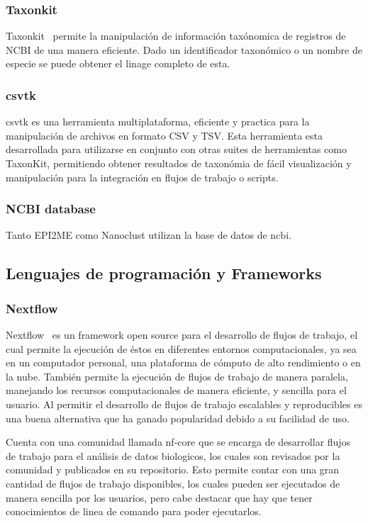 

\subsubsection{Taxonkit}
Taxonkit~\cite{SHEN2021844} permite la manipulación de información taxónomica de registros de NCBI de una manera eficiente. Dado un identificador taxonómico o un nombre de especie se puede obtener el linage completo de esta.

\subsubsection{csvtk}
csvtk es una herramienta multiplataforma, eficiente y practica para la manipulación de archivos en formato CSV y TSV. Esta herramienta esta desarrollada para utilizarse en conjunto con otras suites de herramientas como TaxonKit, permitiendo obtener resultados de taxonómia de fácil visualización y manipulación para la integración en flujos de trabajo o scripts.
\subsubsection{NCBI database}
Tanto EPI2ME como Nanoclust utilizan la base de datos de ncbi.
\subsection{Lenguajes de programación y Frameworks}
\subsubsection{Nextflow}
Nextflow~\cite{di2017nextflow} es un framework open source para el desarrollo de flujos de trabajo, el cual permite la ejecución de éstos en diferentes entornos computacionales, ya sea en un computador personal, una plataforma de cómputo de alto rendimiento o en la nube. También permite la ejecución de flujos de trabajo de manera paralela, manejando los recursos computacionales de manera eficiente, y sencilla para el usuario.
 Al permitir el desarrollo de flujos de trabajo escalables y reproducibles es una buena alternativa que ha ganado popularidad debido a su facilidad de uso.

Cuenta con una comunidad llamada nf-core que se encarga de desarrollar flujos de trabajo para el análisis de datos biologicos, los cuales son revisados por la comunidad y publicados en su repositorio. Esto permite contar con una gran cantidad de flujos de trabajo disponibles, los cuales pueden ser ejecutados de manera sencilla por los usuarios, pero cabe destacar que hay que tener conocimientos de linea de comando para poder ejecutarlos.


